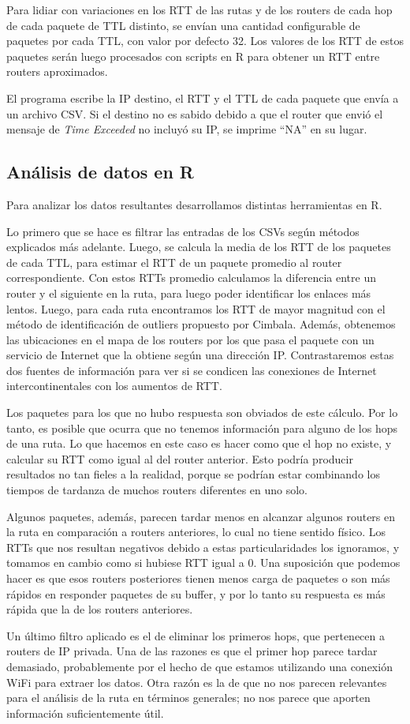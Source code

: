 Para lidiar con variaciones en los RTT de las rutas y de los routers de cada hop
de cada paquete de TTL distinto,
se envían una cantidad configurable de paquetes por cada TTL, con valor por
defecto 32. Los valores de los RTT de estos paquetes serán luego procesados con
scripts en R para obtener un RTT entre routers aproximados.

El programa escribe la IP destino, el RTT y el TTL de cada paquete que envía
a un archivo CSV. Si el destino no es sabido debido a que el router que envió
el mensaje de \emph{Time Exceeded} no incluyó su IP, se imprime ``NA'' en su 
lugar. 

\subsection{Análisis de datos en R}
Para analizar los datos resultantes desarrollamos distintas herramientas en R.

Lo primero que se hace es filtrar las entradas de los CSVs según métodos 
explicados más adelante.
Luego, se calcula la media de los RTT de los
paquetes de cada TTL, para estimar el RTT de un paquete promedio al router
correspondiente. Con estos RTTs promedio calculamos la diferencia entre un 
router y el siguiente en la ruta, para luego poder identificar los enlaces
más lentos. Luego, para cada ruta encontramos los RTT de mayor magnitud con
el método de identificación de outliers propuesto por Cimbala. Además,
obtenemos las ubicaciones en el mapa de los routers por los que pasa 
el paquete con un servicio de Internet que la obtiene según una dirección IP.
Contrastaremos estas dos fuentes de información para ver si se condicen las
conexiones de Internet intercontinentales con los aumentos de RTT. 

Los paquetes para los que no hubo respuesta son obviados de este cálculo. 
Por lo tanto, es posible que ocurra que no tenemos información para alguno de 
los hops de una ruta. Lo que hacemos en este caso es hacer como que el hop no
existe, y calcular su RTT como igual al del router anterior. Esto podría
producir resultados no tan fieles a la realidad, porque se podrían estar
combinando los tiempos de tardanza de muchos routers diferentes en uno solo.

Algunos paquetes, además, parecen tardar menos en alcanzar algunos routers
en la ruta en comparación a routers anteriores, lo cual no tiene sentido
físico. Los RTTs que nos resultan negativos debido a estas particularidades
los ignoramos, y tomamos en cambio como si hubiese RTT igual a 0. Una
suposición que podemos hacer es que esos routers posteriores tienen menos carga
de paquetes o son más rápidos en responder paquetes de su buffer, y por lo
tanto su respuesta es más rápida que la de los routers anteriores.

Un último filtro aplicado es el de eliminar los primeros hops, que pertenecen
a routers de IP privada. Una de las razones es que el primer hop parece
tardar demasiado, probablemente por el hecho de que estamos utilizando una 
conexión WiFi para extraer los datos. Otra razón es la de que no nos parecen
relevantes para el análisis de la ruta en términos generales; no nos parece que
aporten información suficientemente útil.
